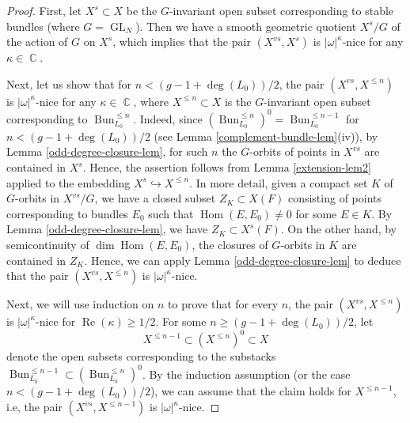\documentclass[12pt,reqno]{amsart}
\DeclareMathOperator\C{\mathbb C}
\theoremstyle{definition}
\theoremstyle{remark}
\numberwithin{equation}{section}
\newcommand{\hra}{\hookrightarrow}
\newcommand{\Hom}{\operatorname{Hom}}
\renewcommand{\SS}{{\mathcal S}}
\newcommand{\sub}{\subset}
\newcommand{\om}{\omega}
\newcommand{\GL}{\operatorname{GL}}
\newcommand{\Bun}{{\operatorname{Bun}}}
\renewcommand{\Re}{{\operatorname{Re}}}
\begin{document}
\begin{proof}
First, let $X^s\sub X$ be the $G$-invariant open subset corresponding to stable bundles (where $G=\GL_N$). Then we have a smooth geometric quotient $X^s/G$ of the action of $G$ on $X^s$,
which implies that the pair $(X^{vs},X^s)$ is $|\om|^{\kappa}$-nice for any $\kappa\in \C$.

Next, let us show that for $n<(g-1+\deg(L_0))/2$, the pair $(X^{vs},X^{\le n})$ is $|\om|^{\kappa}$-nice for any $\kappa\in \C$, where
$X^{\le n}\sub X$ is the $G$-invariant open subset corresponding to $\Bun_{L_0}^{\le n}$.
Indeed, since $(\Bun_{L_0}^{\le n})^0=\Bun_{L_0}^{\le n-1}$ for $n<(g-1+\deg(L_0))/2$ (see Lemma \ref{complement-bundle-lem}(iv)),
by Lemma \ref{odd-degree-closure-lem}, for such $n$ the $G$-orbits of points in $X^{vs}$ are contained in $X^s$.
Hence, the assertion follows from Lemma \ref{extension-lem2} applied to the embedding $X^s\hra X^{\le n}$.
In more detail, given a compact set $K$ of $G$-orbits in $X^{vs}/G$,
we have a closed subset $Z_K\sub X(F)$ consisting of points corresponding to bundles $E_0$ such that $\Hom(E,E_0)\neq 0$ for some $E\in K$.
By Lemma \ref{odd-degree-closure-lem}, we have $Z_K\sub X^s(F)$. On the other hand, by semicontinuity of $\dim\Hom(E,E_0)$,
the closures of $G$-orbits in $K$ are contained in $Z_K$. Hence, we can apply Lemma \ref{odd-degree-closure-lem} to deduce that the pair $(X^{vs},X^{\le n})$
is $|\om|^{\kappa}$-nice.

Next, we will use induction on $n$ to prove that for every $n$, the pair $(X^{vs},X^{\le n})$ is $|\om|^{\kappa}$-nice for $\Re(\kappa)\ge 1/2$.
For some $n\ge (g-1+\deg(L_0))/2$, let 
$$X^{\le n-1}\sub (X^{\le n})^0\sub X$$ 
denote the open subsets corresponding to the substacks $\Bun_{L_0}^{\le n-1}\sub (\Bun_{L_0}^{\le n})^0$.
By the induction assumption (or the case $n<(g-1+\deg(L_0))/2$), we can assume that the claim holds for $X^{\le n-1}$, i.e, the pair $(X^{vs},X^{\le n-1})$
is $|\om|^{\kappa}$-nice.


\end{proof}
\end{document}

